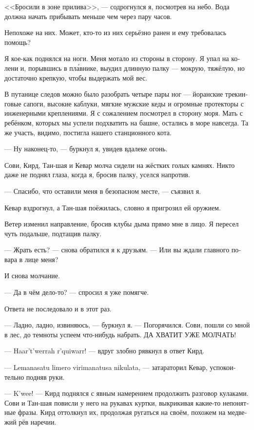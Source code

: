 \documentclass[a4paper,10pt,fleqn]{book}\usepackage{polyglossia}\setdefaultlanguage[babelshorthands=true]{russian}\setotherlanguage{english}\defaultfontfeatures{Ligatures=TeX,Mapping=tex-text}
\newcommand{\asterism}{\vspace{1em}{\centering\Large\bfseries$\ast~\ast~\ast$\par}\vspace{1em}}
\begin{document}
<<Бросили в зоне прилива>>, --- содрогнулся я, посмотрев на небо.
Вода должна начать прибывать меньше чем через пару часов.

Непохоже на них.
Может, кто-то из них серьёзно ранен и ему требовалась помощь?

Я кое-как поднялся на ноги.
Меня мотало из стороны в сторону.
Я упал на колени и, порывшись в пл\'{а}внике, выудил длинную палку --- мокрую, тяжёлую, но достаточно крепкую, чтобы выдержать мой вес.

В путанице следов можно было разобрать четыре пары ног --- йоранские трекинговые сапоги, высокие каблуки, мягкие мужские кеды и огромные протекторы с инженерными креплениями.
Я с сожалением посмотрел в сторону моря.
Мать с ребёнком, которых мы успели подхватить на башне, остались в море навсегда.
Та же участь, видимо, постигла нашего станционного кота.

\asterism

--- Ну наконец-то, --- буркнул я, увидев вдалеке огонь.

Сови, Кирд, Тан-шая и Кевар молча сидели на жёстких голых камнях.
Никто даже не поднял глаза, когда я, бросив палку, уселся напротив.

--- Спасибо, что оставили меня в безопасном месте, --- съязвил я.

Кевар вздрогнул, а Тан-шая поёжилась, словно я пригрозил ей оружием.

Ветер изменил направление, бросив клубы дыма прямо мне в лицо.
Я пересел чуть подальше, подтащив палку.

--- Жрать есть? --- снова обратился я к друзьям.
--- Или вы ждали главного повара в лице меня?

И снова молчание.

--- Да в чём дело-то? --- спросил я уже помягче.

Ответа не последовало и в этот раз.

--- Ладно, ладно, извиняюсь, --- буркнул я.
--- Погорячился.
Сови, пошли со мной в лес, до темноты успеем что-нибудь набрать.
ДА ХВАТИТ УЖЕ МОЛЧАТЬ!

--- Haar't'werrah r'quiwarr! --- вдруг злобно рявкнул в ответ Кирд.

--- Lemanasatu limero virimanatusa nikulata, --- затараторил Кевар, успокоительно подняв руки.

--- K'wee! --- Кирд поднялся с явным намерением продолжить разговор кулаками. 
Сови и Тан-шая повисли у него на рукавах куртки, выкрикивая какие-то непонятные фразы.
Кирд оттолкнул их, продолжая ругаться на своём, похожем на медвежий рёв наречии.
\end{document}
